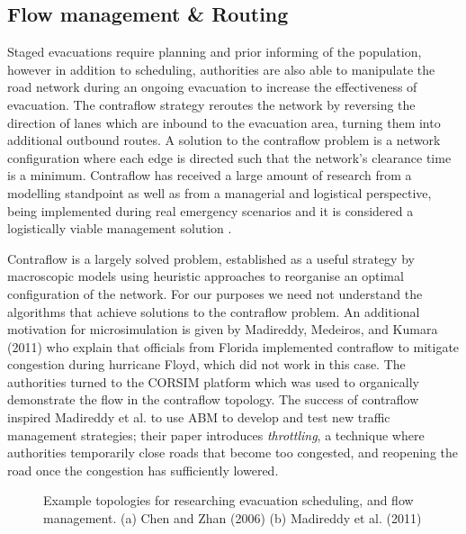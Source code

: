 \subsection{Flow management \& Routing}
Staged evacuations require planning and prior informing of the population, however in addition to scheduling, authorities are also able to manipulate the road network during an ongoing evacuation to increase the effectiveness of evacuation. The contraflow strategy reroutes the network by reversing the direction of lanes which are inbound to the evacuation area, turning them into additional outbound routes. A solution to the contraflow problem is a network configuration where each edge is directed such that the network's clearance time is a minimum. Contraflow has received a large amount of research from a modelling standpoint \cite{Cova2003ARouting,SanghoKim2008ContraflowPlanning} as well as from a managerial and logistical perspective, being implemented during real emergency scenarios and it is considered a logistically viable management solution \cite{Wolshon2001One-Way-Out:Evacuation}.

Contraflow is a largely solved problem, established as a useful strategy by macroscopic models
using heuristic approaches to reorganise an optimal configuration of the network. \cite{SanghoKim2008ContraflowPlanning} For our purposes we need not understand the algorithms that achieve solutions to the contraflow problem.
An additional motivation for microsimulation is given by Madireddy, Medeiros, and Kumara (2011) who explain that officials from Florida implemented contraflow to mitigate congestion during hurricane Floyd, which did not work in this case. The authorities turned to the CORSIM platform which was used to organically demonstrate the flow in the contraflow topology. \cite{Madireddy2011AnManagement}
The success of contraflow inspired Madireddy et al. to use ABM to develop and test new traffic management strategies; their paper introduces \textit{throttling}, a technique where authorities temporarily close roads that become too congested, and reopening the road once the congestion has sufficiently lowered.

\begin{figure}[ht]
    \centering
    \qquad
    \caption{Example topologies for researching evacuation scheduling, and flow management. (a) Chen and Zhan (2006) (b) Madireddy et al. (2011)}
\end{figure}

